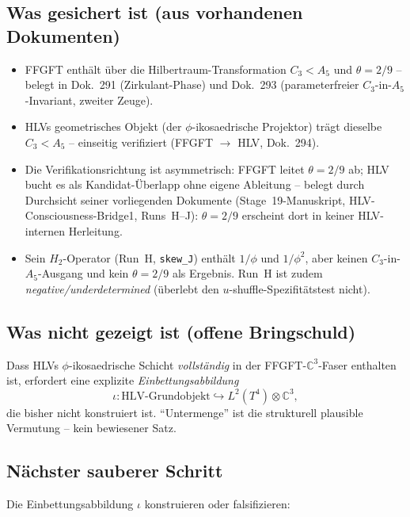 \subsection*{Was gesichert ist (aus vorhandenen Dokumenten)}

\begin{itemize}
  \item FFGFT enthält über die Hilbertraum-Transformation $C_3 < A_5$
    und $\theta = 2/9$ -- belegt in Dok.~291 (Zirkulant-Phase) und
    Dok.~293 (parameterfreier $C_3$-in-$A_5$-Invariant, zweiter Zeuge).
  \item HLVs geometrisches Objekt (der $\phi$-ikosaedrische Projektor)
    trägt dieselbe $C_3 < A_5$ -- einseitig verifiziert
    (FFGFT $\to$ HLV, Dok.~294).
  \item Die Verifikationsrichtung ist asymmetrisch: FFGFT leitet $\theta
    = 2/9$ ab; HLV bucht es als Kandidat-Überlapp ohne eigene Ableitung
    -- belegt durch Durchsicht seiner vorliegenden Dokumente
    (Stage~19-Manuskript, HLV-Consciousness-Bridge1, Runs~H--J): $\theta
    = 2/9$ erscheint dort in keiner HLV-internen Herleitung.
  \item Sein $H_2$-Operator (Run~H, \texttt{skew\_J}) enthält $1/\phi$
    und $1/\phi^2$, aber keinen $C_3$-in-$A_5$-Ausgang und kein $\theta
    = 2/9$ als Ergebnis. Run~H ist zudem \emph{negative/underdetermined}
    (überlebt den $u$-shuffle-Spezifitätstest nicht).
\end{itemize}

\subsection*{Was nicht gezeigt ist (offene Bringschuld)}

Dass HLVs $\phi$-ikosaedrische Schicht \emph{vollständig} in der
FFGFT-$\mathbb{C}^3$-Faser enthalten ist, erfordert eine explizite
\emph{Einbettungsabbildung}
\begin{equation}
  \iota\colon \text{HLV-Grundobjekt} \hookrightarrow
  L^2(T^4)\otimes\mathbb{C}^3,
\end{equation}
die bisher nicht konstruiert ist. \enquote{Untermenge} ist die
strukturell plausible Vermutung -- kein bewiesener Satz.

\subsection*{Nächster sauberer Schritt}

Die Einbettungsabbildung $\iota$ konstruieren oder falsifizieren:

